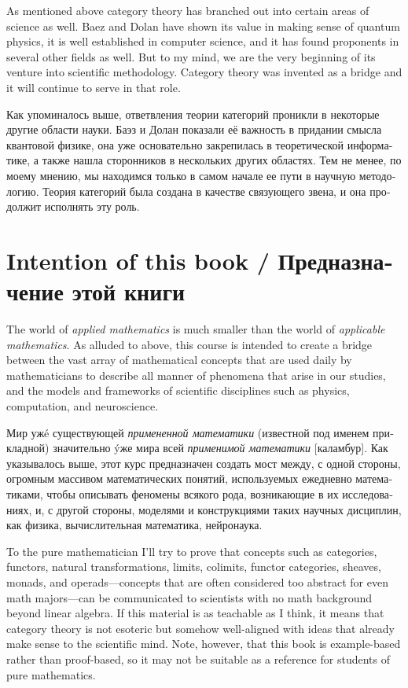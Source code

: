 \documentclass[a4paper]{book}
\theoremstyle{myth}
\begin{document}
\begin{russian}
As mentioned above category theory has branched out into certain areas of science as well. Baez and Dolan have shown its value in making sense of quantum physics, it is well established in computer science, and it has found proponents in several other fields as well. But to my mind, we are the very beginning of its venture into scientific methodology. Category theory was invented as a bridge and it will continue to serve in that role.

Как упоминалось выше, ответвления теории категорий проникли в некоторые другие области науки. Баэз и Долан показали её важность в придании смысла квантовой физике, она уже основательно закрепилась в теоретической информатике, а также нашла сторонников в нескольких других областях. Тем не менее, по моему мнению, мы находимся только в самом начале ее пути в научную методологию. Теория категорий была создана в качестве связующего звена, и она продолжит исполнять эту роль. 


\section{Intention of this book / Предназначение этой книги}

The world of {\em applied mathematics} is much smaller than the world of {\em applicable mathematics}. As alluded to above, this course is intended to create a bridge between the vast array of mathematical concepts that are used daily by mathematicians to describe all manner of phenomena that arise in our studies, and the models and frameworks of scientific disciplines such as physics, computation, and neuroscience.

Мир уж\'e существующей {\em примененной математики} (известной под именем прикладной) значительно \'yже мира всей {\em применимой математики} [каламбур]. Как указывалось выше, этот курс предназначен создать мост между, с одной стороны, огромным массивом математических понятий, используемых ежедневно математиками, чтобы описывать феномены всякого рода, возникающие в их исследованиях, и, с другой стороны, моделями и конструкциями таких научных дисциплин, как физика, вычислительная математика, нейронаука. 

To the pure mathematician I'll try to prove that concepts such as categories, functors, natural transformations, limits, colimits, functor categories, sheaves, monads, and operads---concepts that are often considered too abstract for even math majors---can be communicated to scientists with no math background beyond linear algebra. If this material is as teachable as I think, it means that category theory is not esoteric but somehow well-aligned with ideas that already make sense to the scientific mind. Note, however, that this book is example-based rather than proof-based, so it may not be suitable as a reference for students of pure mathematics.


\end{russian}
\end{document}
